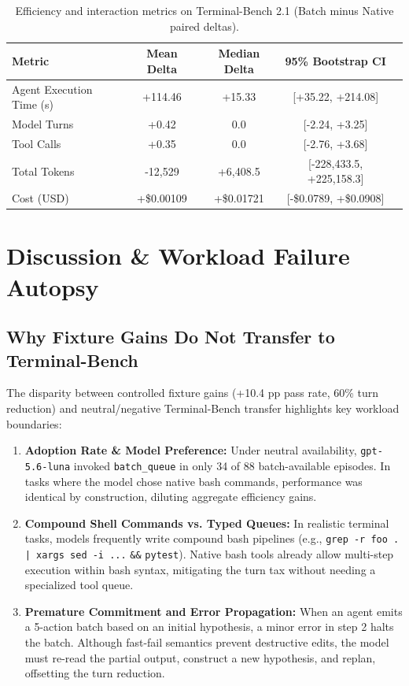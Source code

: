 \documentclass{article}
\begin{document}
\begin{table}[ht]
\centering
\caption{Efficiency and interaction metrics on Terminal-Bench 2.1 (Batch minus Native paired deltas).}
\label{tab:efficiency}
\small
\begin{tabular}{lcccc}
\toprule
\textbf{Metric} & \textbf{Mean Delta} & \textbf{Median Delta} & \textbf{95\% Bootstrap CI} \\
\midrule
Agent Execution Time (s) & +114.46 & +15.33 & [+35.22, +214.08] \\
Model Turns & +0.42 & 0.0 & [-2.24, +3.25] \\
Tool Calls & +0.35 & 0.0 & [-2.76, +3.68] \\
Total Tokens & -12,529 & +6,408.5 & [-228,433.5, +225,158.3] \\
Cost (USD) & +\$0.00109 & +\$0.01721 & [-\$0.0789, +\$0.0908] \\
\bottomrule
\end{tabular}
\end{table}

\section{Discussion \& Workload Failure Autopsy}

\subsection{Why Fixture Gains Do Not Transfer to Terminal-Bench}

The disparity between controlled fixture gains (+10.4 pp pass rate, 60\% turn reduction) and neutral/negative Terminal-Bench transfer highlights key workload boundaries:

\begin{enumerate}
    \item \textbf{Adoption Rate \& Model Preference:} Under neutral availability, \texttt{gpt-5.6-luna} invoked \texttt{batch\_queue} in only 34 of 88 batch-available episodes. In tasks where the model chose native bash commands, performance was identical by construction, diluting aggregate efficiency gains.
    \item \textbf{Compound Shell Commands vs. Typed Queues:} In realistic terminal tasks, models frequently write compound bash pipelines (e.g., \texttt{grep -r foo . | xargs sed -i ...} \texttt{\&\&} \texttt{pytest}). Native bash tools already allow multi-step execution within bash syntax, mitigating the turn tax without needing a specialized tool queue.
    \item \textbf{Premature Commitment and Error Propagation:} When an agent emits a 5-action batch based on an initial hypothesis, a minor error in step 2 halts the batch. Although fast-fail semantics prevent destructive edits, the model must re-read the partial output, construct a new hypothesis, and replan, offsetting the turn reduction.
\end{enumerate}
\end{document}
